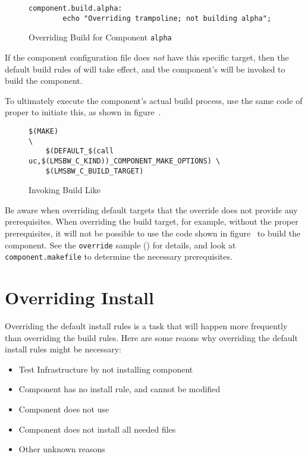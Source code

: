 \begin{figure}[h]
  \hrulefill
\begin{verbatim}
component.build.alpha:
        echo "Overriding trampoline; not building alpha";
\end{verbatim}
  \caption{Overriding Build for Component \texttt{alpha}}\label{overriding:override-build-alpha}
  \hrulefill
\end{figure}


If the component configuration file does \emph{not} have this specific
target, then the default build rules of \lmsbw will take effect, and
tbe component's \makefile will be invoked to build the component.

To ultimately execute the component's actual build process, use the
same code of \lmsbw proper to initiate this, as shown in
figure~.

\begin{figure}[h]
  \hrulefill
\begin{footnotesize}
\begin{verbatim}
$(MAKE)                                                          \
    $(DEFAULT_$(call uc,$(LMSBW_C_KIND))_COMPONENT_MAKE_OPTIONS) \
    $(LMSBW_C_BUILD_TARGET)
\end{verbatim}
\end{footnotesize}
  \caption{Invoking Build Like \lmsbw}\label{overriding:invoke-build-like-lmsbw}
  \hrulefill
\end{figure}


Be aware when overriding default targets that the override does not
provide any prerequisites.  When overriding the build target, for
example, without the proper prerequisites, it will not be possible to
use the code shown in
figure~\tabref{overriding:invoke-build-like-lmsbw} to build the
component.  See the \texttt{override} sample ()
for details, and look at \texttt{component.makefile} to determine the
necessary prerequisites.

\section{Overriding Install}\label{overriding:overriding-install}

Overriding the default install rules is a task that will happen more
frequently than overriding the build rules.  Here are some reaons why
overriding the default install rules might be necessary:

\begin{itemize}
\item Test \bni Infrastructure by not installing component
\item Component \makefile has no install rule, and cannot be modified
\item Component \makefile does not use \destdir
\item Component does not install all needed files
\item Other unknown reasons
\end{itemize}

